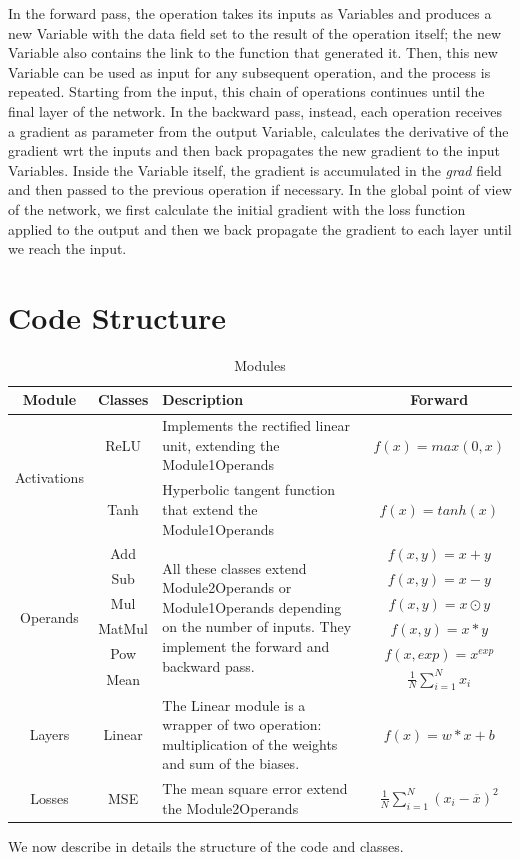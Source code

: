 \documentclass[10pt,conference,compsocconf]{IEEEtran}
\begin{document}
	In the forward pass, the operation takes its inputs as Variables and produces a new Variable with the data field set to the result of the operation itself; the new Variable also contains the link to the function that generated it. Then, this new Variable can be used as input for any subsequent operation, and the process is repeated.  Starting from the input, this chain of operations continues until the final layer of the network. 
	In the backward pass, instead, each operation receives a gradient as parameter from the output Variable, calculates the derivative of the gradient wrt the inputs and then back propagates the new gradient to the input Variables. Inside the Variable itself, the gradient is accumulated in the \textit{grad} field and then passed to the previous operation if necessary. In the global point of view of the network, we first calculate the initial gradient with the loss function applied to the output and then we back propagate the gradient to each layer until we reach the input.
        
        
\section{Code Structure}
\begin{table}
\caption{Modules}
\label{tab:modules}
\begin{tabular}{ | c | c | p{10cm} | c | } 
\hline
Module & Classes & Description & Forward  \\
\hline
\multirow{2}{4em}{Activations} 
& ReLU & Implements the rectified linear unit, extending the Module1Operands & $f(x) = max(0, x)$  \\
& Tanh & Hyperbolic tangent function that extend the Module1Operands & $f(x) = tanh(x)$ \\
\hline
\multirow{6}{4em}{Operands}
& Add & \multirow{6}{30em}{All these classes extend Module2Operands or Module1Operands depending on the number of inputs. They implement the forward and backward pass. } & $f(x, y) = x + y$ \\
& Sub & & $f(x, y) = x - y$ \\ 
& Mul & & $f(x, y) = x \odot y$ \\ 
& MatMul & & $f(x, y) = x * y$ \\ 
& Pow & & $f(x, exp) = x^{exp}$ \\ 
& Mean & & $\frac{1}{N} \sum_{i=1}^N x_i$ \\
\hline
Layers & Linear & The Linear module is a wrapper of two operation: multiplication of the weights and sum of the biases. & $f(x) = w*x + b$ \\ 
\hline
Losses & MSE & The mean square error extend the Module2Operands & $\frac{1}{N} \sum_{i=1}^N (x_i - \overline{x})^2$  \\ 
\hline
\end{tabular}
\end{table}
We now describe in details the structure of the code and classes.
\end{document}
